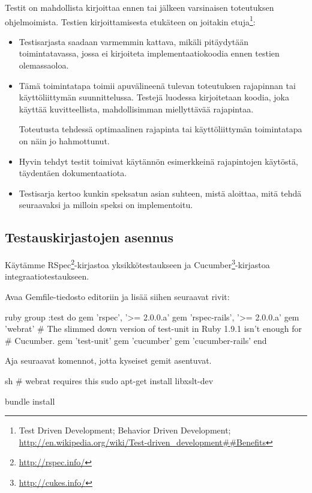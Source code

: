 \documentclass{article}
\newcommand{\en}[1]{\foreignlanguage{english}{#1}}
\begin{document}
Testit on mahdollista kirjoittaa ennen tai jälkeen varsinaisen toteutuksen
ohjelmoimista. Testien kirjoittamisesta etukäteen on joitakin
etuja\footnote{\en{Test Driven Development; Behavior Driven Development;
\url{http://en.wikipedia.org/wiki/Test-driven\_development##Benefits}}}:

\begin{itemize}
\item
Testisarjasta saadaan varmemmin kattava, mikäli pitäydytään toimintatavassa,
jossa ei kirjoiteta implementaatiokoodia ennen testien olemassaoloa.

\item
Tämä toimintatapa toimii apuvälineenä tulevan toteutuksen rajapinnan tai
käyttöliittymän suunnittelussa. Testejä luodessa kirjoitetaan koodia, joka
käyttää kuvitteellista, mahdollisimman miellyttävää rajapintaa.

Toteutusta tehdessä optimaalinen rajapinta tai käyttöliittymän toimintatapa on
näin jo hahmottunut.

\item
Hyvin tehdyt testit toimivat käytännön esimerkkeinä rajapintojen käytöstä,
täydentäen dokumentaatiota.

\item
Testisarja kertoo kunkin speksatun asian suhteen, mistä aloittaa, mitä tehdä
seuraavaksi ja milloin speksi on implementoitu.
\end{itemize}

\subsection{Testauskirjastojen asennus}

Käytämme RSpec\footnote{\url{http://rspec.info/}}-kirjastoa yksikkötestaukseen
ja Cucumber\footnote{\url{http://cukes.info/}}-kirjastoa
integraatiotestaukseen.

\begin{samepage}
Avaa Gemfile-tiedosto editoriin ja lisää siihen seuraavat rivit:

\begin{pygmented}{ruby}
group :test do
  gem 'rspec', '>= 2.0.0.a'
  gem 'rspec-rails', '>= 2.0.0.a'
  gem 'webrat'
  # The slimmed down version of test-unit in Ruby 1.9.1 isn't enough for
  # Cucumber.
  gem 'test-unit'
  gem 'cucumber'
  gem 'cucumber-rails'
end
\end{pygmented}
\end{samepage}

\begin{samepage}
Aja seuraavat komennot, jotta kyseiset gemit asentuvat.

\begin{pygmented}{sh}
# webrat requires this
sudo apt-get install libxslt-dev

bundle install
\end{pygmented}
\end{samepage}
\end{document}
